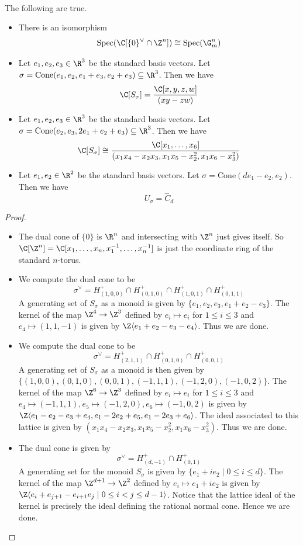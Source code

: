 \documentclass[a4paper]{article}
\begin{document}
\begin{eg}{}{}\\
The following are true. 
\begin{itemize}
\item There is an isomorphism $$\text{Spec}(\C[\{0\}^\vee\cap\Z^n])\cong\text{Spec}(\G_m^n)$$
\item Let $e_1,e_2,e_3\in\R^3$ be the standard basis vectors. Let $\sigma=\text{Cone}(e_1,e_2,e_1+e_3,e_2+e_3)\subseteq\R^3$. Then we have $$\C[S_\sigma]=\frac{\C[x,y,z,w]}{(xy-zw)}$$
\item Let $e_1,e_2,e_3\in\R^3$ be the standard basis vectors. Let $\sigma=\text{Cone}(e_2,e_3,2e_1+e_2+e_3)\subseteq\R^3$. Then we have $$\C[S_\sigma]\cong\frac{\C[x_1,\dots,x_6]}{(x_1x_4-x_2x_3,x_1x_5-x_2^2,x_1x_6-x_3^2)}$$
\item Let $e_1,e_2\in\R^2$ be the standard basis vectors. Let $\sigma=\text{Cone}(de_1-e_2,e_2)$. Then we have $$U_\sigma=\widehat{C}_d$$
\end{itemize}
\begin{proof}
\begin{itemize}
\item The dual cone of $\{0\}$ is $\R^n$ and intersecting with $\Z^n$ just gives itself. So $\C[\Z^n]=\C[x_1,\dots,x_n,x_1^{-1},\dots,x_n^{-1}]$ is just the coordinate ring of the standard $n$-torus. 
\item We compute the dual cone to be $$\sigma^\vee=H_{(1,0,0)}^+\cap H_{(0,1,0)}^+\cap H_{(1,0,1)}^+\cap H_{(0,1,1)}^+$$ A generating set of $S_\sigma$ as a monoid is given by $\{e_1,e_2,e_3,e_1+e_2-e_3\}$. The kernel of the map $\Z^4\to\Z^3$ defined by $e_i\mapsto e_i$ for $1\leq i\leq 3$ and $e_4\mapsto(1,1,-1)$ is given by $\Z\langle e_1+e_2-e_3-e_4\rangle$. Thus we are done. 
\item We compute the dual cone to be $$\sigma^\vee=H_{(2,1,1)}^+\cap H_{(0,1,0)}^+\cap H_{(0,0,1)}^+$$ A generating set of $S_\sigma$ as a monoid is then given by $\{(1,0,0),(0,1,0),(0,0,1),(-1,1,1),(-1,2,0),(-1,0,2)\}$. The kernel of the map $\Z^6\to\Z^3$ defined by $e_i\mapsto e_i$ for $1\leq i\leq 3$ and $e_4\mapsto(-1,1,1),e_5\mapsto(-1,2,0),e_6\mapsto(-1,0,2)$ is given by $\Z\langle e_1-e_2-e_3+e_4,e_1-2e_2+e_5,e_1-2e_3+e_6\rangle$. The ideal associated to this lattice is given by $(x_1x_4-x_2x_3,x_1x_5-x_2^2,x_1x_6-x_3^2)$. Thus we are done. 
\item The dual cone is given by $$\sigma^\vee=H_{(d,-1)}^+\cap H_{(0,1)}^+$$ A generating set for the monoid $S_\sigma$ is given by $\{e_1+ie_2\;|\;0\leq i\leq d\}$. The kernel of the map $\Z^{d+1}\to\Z^2$ defined by $e_i\mapsto e_1+ie_2$ is given by $\Z\langle e_i+e_{j+1}-e_{i+1}e_j\;|\;0\leq i<j\leq d-1\rangle$. Notice that the lattice ideal of the kernel is precisely the ideal defining the rational normal cone. Hence we are done. 
\end{itemize}
\end{proof}
\end{eg}
\end{document}
